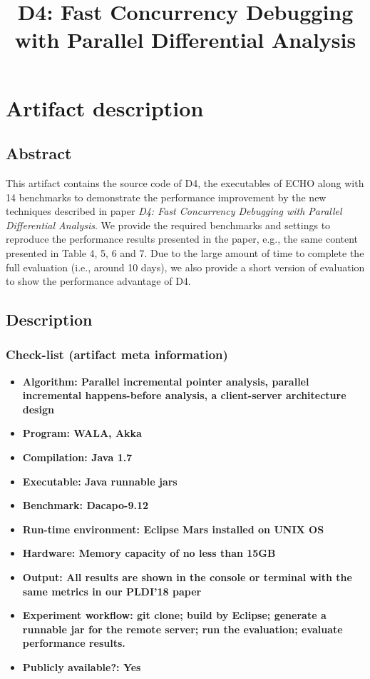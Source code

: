 \documentclass[preprint, number, 10pt]{sigplanconf}
\begin{document}
\setlength{\pdfpageheight}{\paperheight}
\setlength{\pdfpagewidth}{\paperwidth}


\title{D4: Fast Concurrency Debugging with Parallel Differential Analysis}
\subtitle{}

\maketitle

\section{Artifact description}
\subsection{Abstract}
This artifact contains the source code of D4, the executables of ECHO along with 14 benchmarks to demonstrate the performance improvement
by the new techniques described in paper \textit{D4: Fast Concurrency Debugging with Parallel Differential Analysis}. We provide the required
benchmarks and settings to reproduce the performance results presented in the paper, e.g., the same content presented in Table 4, 5, 6 and 7. Due to the large amount of time to complete the full evaluation (i.e., around 10 days), we also provide a short version of evaluation to show the performance advantage of D4.

\subsection{Description}
\subsubsection{Check-list (artifact meta information)}
\begin{itemize}
\item \textbf{Algorithm: Parallel incremental pointer analysis, parallel incremental happens-before analysis, a client-server architecture design}
\item \textbf{Program: WALA, Akka}
\item \textbf{Compilation: Java 1.7}
\item \textbf{Executable: Java runnable jars}
\item \textbf{Benchmark: Dacapo-9.12}
\item \textbf{Run-time environment: Eclipse Mars installed on UNIX OS}
\item \textbf{Hardware: Memory capacity of no less than 15GB} %
\item \textbf{Output: All results are shown in the console or terminal with the same metrics in our PLDI'18 paper} %
\item \textbf{Experiment workflow: git clone; build by Eclipse; generate a runnable jar for the remote server;
run the evaluation; evaluate performance results.}
\item \textbf{Publicly available?: Yes}
\end{itemize}
\end{document}

